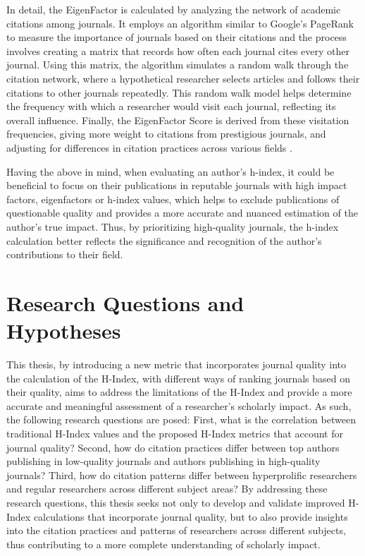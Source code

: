 In detail, the EigenFactor is calculated by analyzing the network of academic
citations among journals. It employs an algorithm similar to Google's PageRank
to measure the importance of journals based on their citations and the process
involves creating a matrix that records how often each journal cites every
other journal. Using this matrix, the algorithm simulates a random walk through
the citation network, where a hypothetical researcher selects articles and
follows their citations to other journals repeatedly. This random walk model
helps determine the frequency with which a researcher would visit each journal,
reflecting its overall influence. Finally, the EigenFactor Score is derived
from these visitation frequencies, giving more weight to citations from
prestigious journals, and adjusting for differences in citation practices
across various fields \cite{Bergstrom11433, Alan2009}.

Having the above in mind, when evaluating an author's h-index, it could be
beneficial to focus on their publications in reputable journals with high
impact factors, eigenfactors or h-index values, which helps to exclude
publications of questionable quality and provides a more accurate and nuanced
estimation of the author's true impact. Thus, by prioritizing high-quality
journals, the h-index calculation better reflects the significance and
recognition of the author's contributions to their field.

\section{Research Questions and Hypotheses}
This thesis, by introducing a new metric that incorporates journal quality into
the calculation of the H-Index, with different ways of ranking journals based
on their quality, aims to address the limitations of the H-Index and provide a
more accurate and meaningful assessment of a researcher's scholarly impact. As
such, the following research questions are posed: First, what is the
correlation between traditional H-Index values and the proposed H-Index metrics
that account for journal quality? Second, how do citation practices differ
between top authors publishing in low-quality journals and authors publishing
in high-quality journals? Third, how do citation patterns differ between
hyperprolific researchers and regular researchers across different subject
areas? By addressing these research questions, this thesis seeks not only to
develop and validate improved H-Index calculations that incorporate journal
quality, but to also provide insights into the citation practices and patterns
of researchers across different subjects, thus contributing to a more complete
understanding of scholarly impact.
